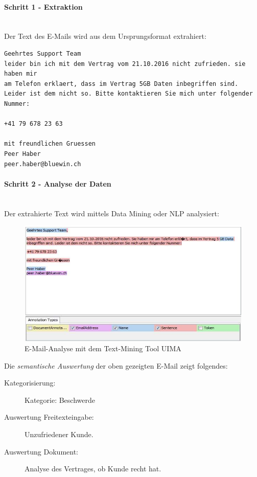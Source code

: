 \documentclass[a4paper, 11pt, nofootinbib]{article}
\begin{document}
\paragraph{Schritt 1 - Extraktion} \mbox{}\\
Der Text des E-Mails wird aus dem Ursprungsformat extrahiert:

\begin{lstlisting}
Geehrtes Support Team
leider bin ich mit dem Vertrag vom 21.10.2016 nicht zufrieden. sie haben mir 
am Telefon erklaert, dass im Vertrag 5GB Daten inbegriffen sind. 
Leider ist dem nicht so. Bitte kontaktieren Sie mich unter folgender Nummer:

+41 79 678 23 63

mit freundlichen Gruessen
Peer Haber
peer.haber@bluewin.ch
\end{lstlisting}

\newpage

\paragraph{Schritt 2 - Analyse der Daten} \mbox{} \\
Der extrahierte Text wird mittels Data Mining oder NLP analysiert:
\begin{figure}[htb]
	\centering
	\includegraphics[keepaspectratio=true,height=15\baselineskip]{NLP_email.PNG}
	\caption{E-Mail-Analyse mit dem Text-Mining Tool UIMA}
	\label{fig:nlpemail}
\end{figure}

Die \textit{semantische Auswertung} der oben gezeigten E-Mail zeigt folgendes:

\begin{description}
	\item[Kategorisierung: ] Kategorie: Beschwerde
	\item[Auswertung Freitexteingabe: ] Unzufriedener Kunde.
	\item[Auswertung Dokument: ] Analyse des Vertrages, ob Kunde recht hat.
\end{description}
\end{document}
